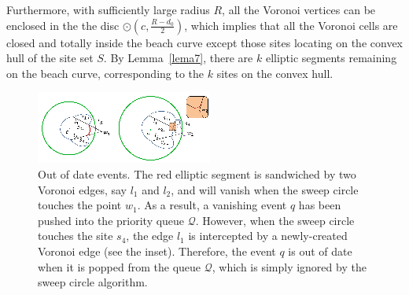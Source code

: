 {{Furthermore, with sufficiently large radius $R$, all the Voronoi
vertices can be enclosed in the the disc $\odot(c,\frac{R-d_0}{2})$,
which implies that all the Voronoi cells are closed and totally
inside the beach curve except those sites locating on the convex
hull of the site set $S$. By Lemma~\ref{lema7}, there are $k$
elliptic segments remaining on the beach curve, corresponding to the
$k$ sites on the convex hull. %
%
%

\begin{figure}
\vspace{-2mm}
\begin{center}
\includegraphics[width=0.9\columnwidth]{figs/sweepcircle/invalidEvt.png}
\end{center}
\vspace{-0.1in}\caption{Out of date events. The red elliptic segment
is sandwiched by two Voronoi edges, say $l_1$ and $l_2$, and will
vanish when the sweep circle touches the point $w_1$. As a result, a
vanishing event $q$ has been pushed into the priority queue
$\mathcal{Q}$. However, when the sweep circle touches the site
$s_4$, the edge $l_1$ is intercepted by a newly-created Voronoi edge
(see the inset). Therefore, the event $q$ is out of date when it is
popped from the queue $\mathcal{Q}$, which is simply ignored by the
sweep circle algorithm.} \label{fig:invalidevents}
\end{figure}

}}
